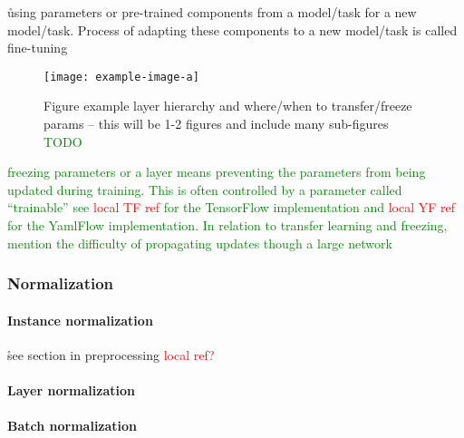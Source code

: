 
\r{using parameters or pre-trained components from a model/task for a new model/task.  Process of adapting these components to a new model/task is called fine-tuning}


\begin{figure}[htp]
	\centering
	\texttt{[image: example-image-a]}\hfil
	\caption{Figure example layer hierarchy and where/when to transfer/freeze params -- this will be 1-2 figures and include many sub-figures \textcolor{green}{TODO}}
	\label{fig:transfer_learning_subfigs_a}
\end{figure}

\textcolor{green}{{freezing} parameters or a layer means preventing the parameters from being updated during training. This is often controlled by a parameter called ``trainable'' see \textcolor{red}{local TF ref} for the TensorFlow implementation and \textcolor{red}{local YF ref} for the YamlFlow implementation. In relation to transfer learning and freezing, mention the difficulty of propagating updates though a large network}

\subsubsection{Normalization}



\paragraph{Instance normalization}

\r{see section in preprocessing \textcolor{red}{local ref?}}

\paragraph{Layer normalization}

\paragraph{Batch normalization}


